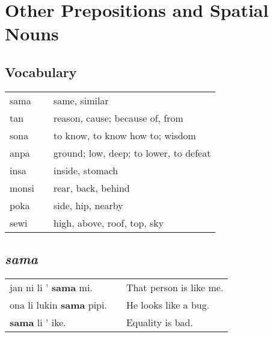 \section{Other Prepositions and Spatial Nouns}
\subsection*{Vocabulary}
%
\begin{supertabular}{p{5,5cm}|ll}
sama && same, similar \\
tan && reason, cause; because of, from \\
sona && to know, to know how to; wisdom \\
anpa && ground; low, deep; to lower, to defeat \\ 
insa && inside, stomach \\
monsi && rear, back, behind \\
poka && side, hip, nearby \\
sewi && high, above, roof, top, sky \\
\end{supertabular} 
%
\subsection*{\textit{sama}}
%
\begin{supertabular}{p{5,5cm}|ll}
jan ni li ' \textbf{sama} mi. && That person is like me. \\
ona li lukin \textbf{sama} pipi. && He looks like a bug. \\
\textbf{sama} li ' ike. && Equality is bad. \\
\end{supertabular} 
%
